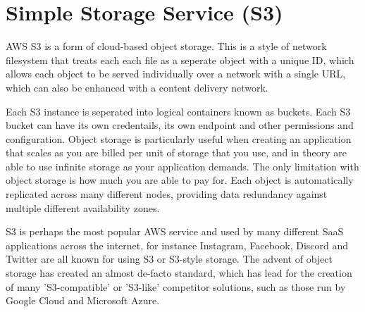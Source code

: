 \chapter{Simple Storage Service (S3)}\label{ch:simple-storage-service}

AWS S3 is a form of cloud-based object storage.
This is a style of network filesystem that treats each each file as a seperate object with a unique ID, which allows each object to be served individually over a network with a single URL, which can also be enhanced with a content delivery network.

Each S3 instance is seperated into logical containers known as buckets. Each S3 bucket can have its own credentails, its own endpoint and other permissions and configuration. Object storage is particularly useful when creating an application that scales as you are billed per unit of storage that you use, and in theory are able to use infinite storage as your application demands. The only limitation with object storage is how much you are able to pay for. Each object is automatically replicated across many different nodes, providing data redundancy against multiple different availability zones.

S3 is perhaps the most popular AWS service and used by many different SaaS applications across the internet, for instance Instagram, Facebook, Discord and Twitter are all known for using S3 or S3-style storage. The advent of object storage has created an almost de-facto standard, which has lead for the creation of many 'S3-compatible' or 'S3-like' competitor solutions, such as those run by Google Cloud and Microsoft Azure.